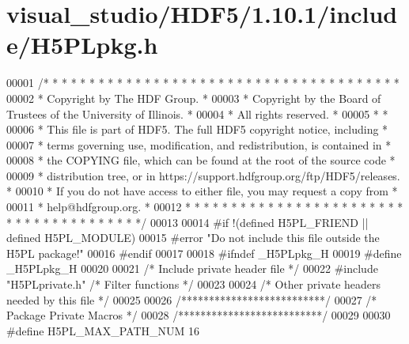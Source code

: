 \hypertarget{visual__studio_2_h_d_f5_21_810_81_2include_2_h5_p_lpkg_8h_source}{}\section{visual\+\_\+studio/\+H\+D\+F5/1.10.1/include/\+H5\+P\+Lpkg.h}
\label{visual__studio_2_h_d_f5_21_810_81_2include_2_h5_p_lpkg_8h_source}

\begin{DoxyCode}
00001 \textcolor{comment}{/* * * * * * * * * * * * * * * * * * * * * * * * * * * * * * * * * * * * * * *}
00002 \textcolor{comment}{ * Copyright by The HDF Group.                                               *}
00003 \textcolor{comment}{ * Copyright by the Board of Trustees of the University of Illinois.         *}
00004 \textcolor{comment}{ * All rights reserved.                                                      *}
00005 \textcolor{comment}{ *                                                                           *}
00006 \textcolor{comment}{ * This file is part of HDF5.  The full HDF5 copyright notice, including     *}
00007 \textcolor{comment}{ * terms governing use, modification, and redistribution, is contained in    *}
00008 \textcolor{comment}{ * the COPYING file, which can be found at the root of the source code       *}
00009 \textcolor{comment}{ * distribution tree, or in https://support.hdfgroup.org/ftp/HDF5/releases.  *}
00010 \textcolor{comment}{ * If you do not have access to either file, you may request a copy from     *}
00011 \textcolor{comment}{ * help@hdfgroup.org.                                                        *}
00012 \textcolor{comment}{ * * * * * * * * * * * * * * * * * * * * * * * * * * * * * * * * * * * * * * */}
00013 
00014 \textcolor{preprocessor}{#if !(defined H5PL\_FRIEND || defined H5PL\_MODULE)}
00015 \textcolor{preprocessor}{#error "Do not include this file outside the H5PL package!"}
00016 \textcolor{preprocessor}{#endif}
00017 
00018 \textcolor{preprocessor}{#ifndef \_H5PLpkg\_H}
00019 \textcolor{preprocessor}{#define \_H5PLpkg\_H}
00020 
00021 \textcolor{comment}{/* Include private header file */}
00022 \textcolor{preprocessor}{#include "H5PLprivate.h"}          \textcolor{comment}{/* Filter functions                */}
00023 
00024 \textcolor{comment}{/* Other private headers needed by this file */}
00025 
00026 \textcolor{comment}{/**************************/}
00027 \textcolor{comment}{/* Package Private Macros */}
00028 \textcolor{comment}{/**************************/}
00029 
00030 \textcolor{preprocessor}{#define H5PL\_MAX\_PATH\_NUM       16}

\end{DoxyCode}
